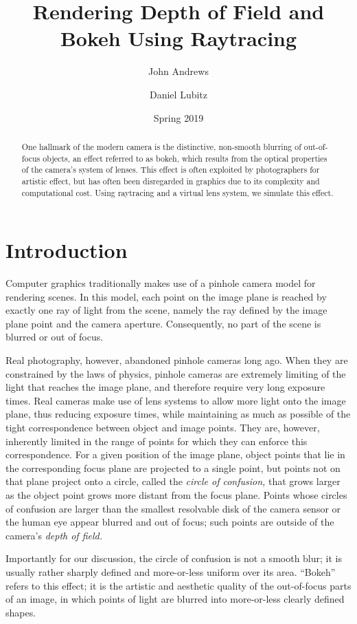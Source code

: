 \documentclass[twocolumn]{article}
\title{Rendering Depth of Field and Bokeh Using Raytracing}
\author{John Andrews \and Daniel Lubitz}
\date{Spring 2019}
\begin{document}
\maketitle

\begin{abstract}
  One hallmark of the modern camera is the distinctive, non-smooth blurring of out-of-focus
  objects, an effect referred to as bokeh, which results from the optical
  properties of the camera's
  system of lenses. This effect is often exploited by photographers for artistic effect,
  but has often been disregarded in graphics due to its complexity and computational cost. Using
  raytracing and a virtual lens system, we simulate this effect.
\end{abstract}

\section{Introduction}
Computer graphics traditionally makes use of a pinhole camera model for
rendering scenes. In this model, each point on the image plane is reached by
exactly one ray of light from the scene, namely the ray defined by the image
plane point and the camera aperture. Consequently, no part of the scene is
blurred or out of focus.

Real photography, however, abandoned pinhole cameras long ago. When they are
constrained by the laws of physics, pinhole cameras are extremely limiting of
the light that reaches the image plane, and therefore require very long exposure
times. Real cameras make use of lens systems to allow more light onto the image
plane, thus reducing exposure times, while maintaining as much as possible of
the tight correspondence between object and image points. They are, however,
inherently limited in the range of points for which they can enforce this
correspondence. For a given position of the image plane, object points that lie
in the corresponding focus plane are projected to a single point, but points not
on that plane project onto a circle, called the \emph{circle of confusion,} that
grows larger as the object point grows more distant from the focus plane. Points
whose circles of confusion are larger than the smallest resolvable disk of the
camera sensor or the human eye appear blurred and out of focus; such points are
outside of the camera's \emph{depth of field.}

Importantly for our discussion, the circle of confusion is not a smooth blur; it
is usually rather sharply defined and more-or-less uniform over its area.
``Bokeh'' refers to this effect; it is the artistic and aesthetic quality of the
out-of-focus parts of an image, in which points of light are blurred into
more-or-less clearly defined shapes.
\end{document}
